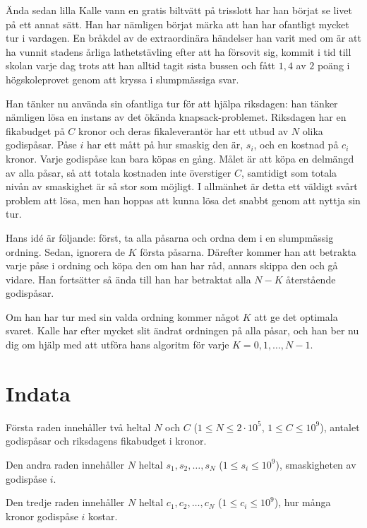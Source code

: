 \noindent

Ända sedan lilla Kalle vann en gratis biltvätt på trisslott har han börjat se livet på ett annat sätt.
Han har nämligen börjat märka att han har ofantligt mycket tur i vardagen.
En bråkdel av de extraordinära händelser han varit med om är att ha vunnit stadens årliga lathetstävling
efter att ha försovit sig, kommit i tid till skolan varje dag trots att han alltid tagit
sista bussen och fått $1,4$ av $2$ poäng i högskoleprovet genom att kryssa i slumpmässiga svar.

Han tänker nu använda sin ofantliga tur för att hjälpa riksdagen: han tänker nämligen lösa en instans
av det ökända knapsack-problemet. Riksdagen har en fikabudget på $C$ kronor och deras fikaleverantör
har ett utbud av $N$ olika godispåsar. Påse $i$ har ett mått på hur smaskig den är,
$s_i$, och en kostnad på $c_i$ kronor. Varje godispåse kan bara köpas en gång.
Målet är att köpa en delmängd av alla påsar, så att totala kostnaden inte överstiger $C$, samtidigt som
totala nivån av smaskighet är så stor som möjligt. I allmänhet är detta ett väldigt svårt problem att lösa,
men han hoppas att kunna lösa det snabbt genom att nyttja sin tur. 

Hans idé är följande: först, ta alla påsarna och ordna dem i en slumpmässig ordning. Sedan, ignorera
de $K$ första påsarna. Därefter kommer han att betrakta varje påse i ordning och köpa den om han har
råd, annars skippa den och gå vidare. Han fortsätter så ända till han har betraktat alla $N-K$ återstående
godispåsar. 

Om han har tur med sin valda ordning kommer något $K$ att ge det optimala svaret. Kalle har efter mycket slit
ändrat ordningen på alla påsar, och han ber nu dig om hjälp med att utföra hans algoritm för varje $K=0,1,\dots,N-1$.

\section*{Indata}
Första raden innehåller två heltal $N$ och $C$ ($1 \leq N \leq 2 \cdot 10^5$, $1 \leq C \leq 10^9$), antalet godispåsar 
och riksdagens fikabudget i kronor.

Den andra raden innehåller $N$ heltal $s_1, s_2, \dots, s_N$ ($1 \leq s_i \leq 10^9$), smaskigheten av godispåse $i$.

Den tredje raden innehåller $N$ heltal $c_1, c_2, \dots, c_N$ ($1 \leq c_i \leq 10^9$), hur många kronor godispåse $i$
kostar.

